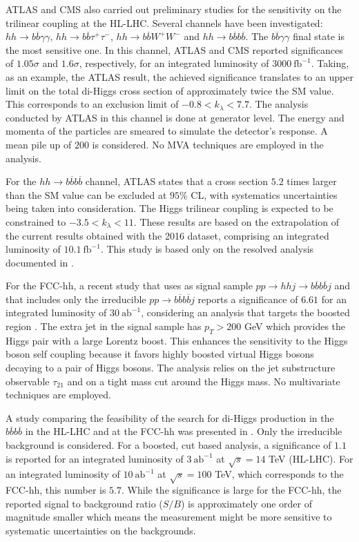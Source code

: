 ATLAS and CMS also carried out preliminary studies for the sensitivity on the trilinear coupling at the HL-LHC. Several channels have been investigated: $hh\rightarrow  b\overline{b}\gamma\gamma$, $hh\rightarrow b\overline{b} \tau^+ \tau^-$, $hh\rightarrow b\overline{b} W^+ W^-$ and $hh\rightarrow  b\overline{b}b\overline{b}$. The $b\overline{b}\gamma\gamma$ final state is the most sensitive one. In this channel, ATLAS and CMS reported significances of $1.05\sigma$ and $1.6\sigma$, respectively, for an integrated luminosity of $3000~\text{fb}^{-1}$. Taking, as an example, the ATLAS result, the achieved significance translates to an upper limit on the total di-Higgs cross section of approximately twice the SM value. This corresponds to an exclusion limit of $-0.8<k_{\lambda}<7.7$. The analysis conducted by ATLAS in this channel is done at generator level. The energy and momenta of the particles are smeared to simulate the detector's response. A mean pile up of $200$ is considered. No MVA techniques are employed in the analysis. 

For the $hh\rightarrow  b\overline{b}b\overline{b}$ channel, ATLAS states that a cross section $5.2$ times larger than the SM value can be excluded at $95\%$ CL, with systematics uncertainties being taken into consideration. The Higgs trilinear coupling is expected to be constrained to $-3.5<k_{\lambda}<11$. These results are based on the extrapolation of the current results obtained with the 2016 dataset, comprising an integrated luminosity of $10.1~\text{fb}^{-1}$. This study is based only on the resolved analysis documented in \cite{hh2bbbbATLAS}.

For the FCC-hh, a recent study that uses as signal sample $pp\rightarrow hhj\rightarrow b\overline{b}b\overline{b}j$ and that includes only the irreducible $pp\rightarrow b\overline{b}b\overline{b}j$ reports a significance of $6.61$ for an integrated luminosity of $30~\text{ab}^{-1}$, considering an analysis that targets the boosted region \cite{hh+jet_100TeV}. The extra jet in the signal sample has $p_T>200$ GeV which provides the Higgs pair with a large Lorentz boost. This enhances the sensitivity to the Higgs boson self coupling because it favors highly boosted virtual Higgs bosons decaying to a pair of Higgs bosons. The analysis relies on the jet substructure observable $\tau_{21}$ and on a tight mass cut around the Higgs mass. No multivariate techniques are employed. 

A study comparing the feasibility of the search for di-Higgs production in the $b\overline{b}b\overline{b}$ in the HL-LHC and at the FCC-hh was presented in \cite{hhFeasibility1_100TeV}. Only the irreducible background is considered. For a boosted, cut based analysis, a significance of $1.1$ is reported for an integrated luminosity of $3~\text{ab}^{-1}$ at $\sqrt{s}=14$ TeV (HL-LHC). For an integrated luminosity of $10~\text{ab}^{-1}$ at $\sqrt{s}=100$ TeV, which corresponds to the FCC-hh, this number is $5.7$. While the significance is large for the FCC-hh, the reported signal to background ratio ($S/B$) is approximately one order of magnitude smaller which means the measurement might be more sensitive to systematic uncertainties on the backgrounds. 

